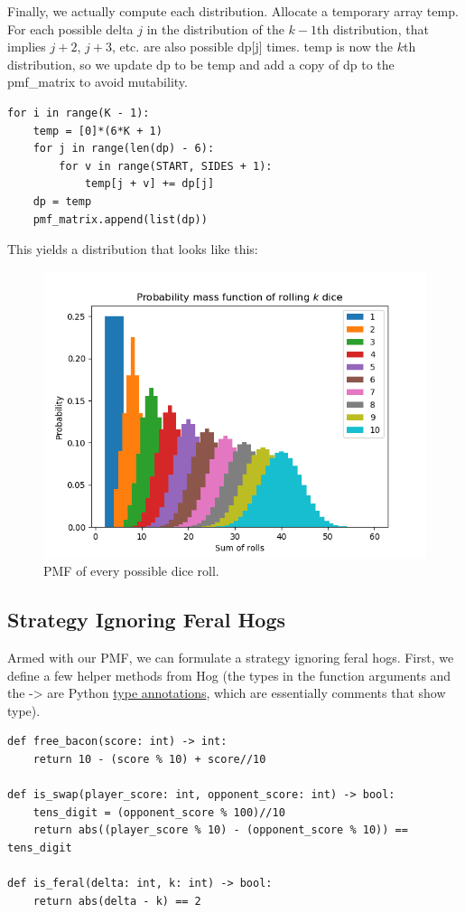 \documentclass[11pt, oneside]{article}
\begin{document}
Finally, we actually compute each distribution.
Allocate a temporary array temp.
For each possible delta \( j \) in the distribution of the \( k - 1\)th distribution,
that implies \( j + 2 \), \( j + 3 \), etc. are also possible dp[j] times. 
temp is now the \( k \)th distribution, so we update dp to be temp
and add a copy of dp to the pmf\_matrix to avoid mutability.

\begin{verbatim}
for i in range(K - 1):
    temp = [0]*(6*K + 1)
    for j in range(len(dp) - 6):
        for v in range(START, SIDES + 1):
            temp[j + v] += dp[j]
    dp = temp
    pmf_matrix.append(list(dp))
\end{verbatim}

This yields a distribution that looks like this:
\begin{figure}[h!]
  \centering
  \includegraphics[scale=0.55]{pmf.png}
  \caption{PMF of every possible dice roll.}
\end{figure}

\subsection{Strategy Ignoring Feral Hogs}

Armed with our PMF, we can formulate a strategy ignoring feral hogs.
First, we define a few helper methods from Hog 
(the types in the function arguments and the -> are Python 
\href{https://docs.python.org/3/library/typing.html}{type annotations},
which are essentially comments that show type).

\begin{verbatim}
def free_bacon(score: int) -> int:
    return 10 - (score % 10) + score//10

def is_swap(player_score: int, opponent_score: int) -> bool:
    tens_digit = (opponent_score % 100)//10
    return abs((player_score % 10) - (opponent_score % 10)) == tens_digit

def is_feral(delta: int, k: int) -> bool: 
    return abs(delta - k) == 2
\end{verbatim} 
\end{document}
